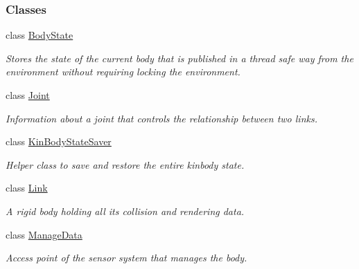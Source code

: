 \subsubsection*{Classes}
\begin{DoxyCompactItemize}
\item 
class \hyperlink{classOpenRAVE_1_1KinBody_1_1BodyState}{BodyState}
\begin{DoxyCompactList}\small\item\em Stores the state of the current body that is published in a thread safe way from the environment without requiring locking the environment. \item\end{DoxyCompactList}\item 
class \hyperlink{classOpenRAVE_1_1KinBody_1_1Joint}{Joint}
\begin{DoxyCompactList}\small\item\em Information about a joint that controls the relationship between two links. \item\end{DoxyCompactList}\item 
class \hyperlink{classOpenRAVE_1_1KinBody_1_1KinBodyStateSaver}{KinBodyStateSaver}
\begin{DoxyCompactList}\small\item\em Helper class to save and restore the entire kinbody state. \item\end{DoxyCompactList}\item 
class \hyperlink{classOpenRAVE_1_1KinBody_1_1Link}{Link}
\begin{DoxyCompactList}\small\item\em A rigid body holding all its collision and rendering data. \item\end{DoxyCompactList}\item 
class \hyperlink{classOpenRAVE_1_1KinBody_1_1ManageData}{ManageData}
\begin{DoxyCompactList}\small\item\em Access point of the sensor system that manages the body. \item\end{DoxyCompactList}\end{DoxyCompactItemize}
